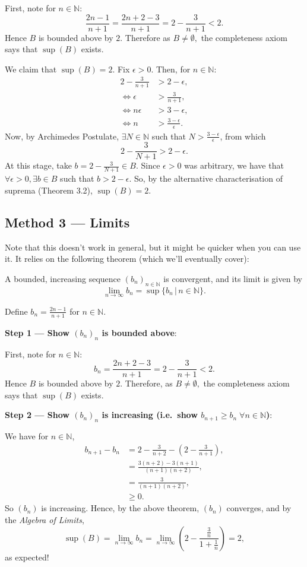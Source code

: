 \documentclass[
  10pt,
  a4paper]{article}
\theoremstyle{plain}
\theoremstyle{definition}
\theoremstyle{plain}
\theoremstyle{plain}
\theoremstyle{plain}
\theoremstyle{plain}
\theoremstyle{definition}
\theoremstyle{definition}
\newtheorem*{Order Axioms*}{Order Axioms}\newtheorem{Order Axioms}{Order Axioms}[section]
\theoremstyle{remark}
\theoremstyle{remark}
\let\BeginKnitrBlock\begin \let\EndKnitrBlock\end
\begin{document}
\BeginKnitrBlock{solution*}
First, note for \(n\in\mathbb{N}\): \[\frac{2n-1}{n+1} = \frac{2n+2-3}{n+1} = 2 - \frac{3}{n+1} < 2.\] Hence \(B\) is bounded above by \(2\). Therefore as \(B \neq \emptyset,\) the completeness axiom says that \(\sup(B)\) exists.

We claim that \(\sup(B) = 2.\) Fix \(\epsilon > 0.\) Then, for \(n \in \mathbb{N}:\)
\begin{align*}
2 - \frac{3}{n+1} &> 2-\epsilon,\\
\Leftrightarrow \epsilon &> \frac{3}{n+1},\\
\Leftrightarrow n\epsilon &> 3 - \epsilon,\\
\Leftrightarrow n &> \frac{3-\epsilon}{\epsilon}.
\end{align*}
Now, by Archimedes Postulate, \(\exists N \in \mathbb{N}\) such that \(N > \frac{3-\epsilon}{\epsilon}\), from which \[2 - \frac{3}{N+1} > 2- \epsilon.\] At this stage, take \(b = 2 - \frac{3}{N+1} \in B\). Since \(\epsilon > 0\) was arbitrary, we have that \(\forall \epsilon > 0, \exists b \in B\) such that \(b > 2-\epsilon.\) So, by the alternative characterisation of suprema (Theorem 3.2), \(\sup(B) = 2.\)
\EndKnitrBlock{solution*}

\hypertarget{method-3-limits}{%
\subsection*{Method 3 --- Limits}\label{method-3-limits}}

Note that this doesn't work in general, but it might be quicker when you can use it. It relies on the following theorem (which we'll eventually cover):
\BeginKnitrBlock{theorem}
{\label{thm:unnamed-chunk-5} }A bounded, increasing sequence \((b_n)_{n \in \mathbb{N}}\) is convergent, and its limit is given by \[\lim_{n \to \infty} b_n = \sup\lbrace b_n \,\lvert\, n \in \mathbb{N} \rbrace.\]
\EndKnitrBlock{theorem}

\BeginKnitrBlock{solution*}
Define \(b_n = \frac{2n - 1}{n+1}\) for \(n \in \mathbb{N}\).

\textbf{Step 1 --- Show \((b_n)_n\) is bounded above}:

First, note for \(n\in\mathbb{N}\): \[b_n = \frac{2n+2-3}{n+1} = 2 - \frac{3}{n+1} < 2.\] Hence \(B\) is bounded above by \(2\). Therefore, as \(B \neq \emptyset,\) the completeness axiom says that \(\sup(B)\) exists.

\textbf{Step 2 --- Show \((b_n)_n\) is increasing (i.e.~show \(b_{n+1} \geq b_n \; \forall n \in \mathbb{N}\))}:

We have for \(n \in \mathbb{N}\),
\begin{align*}
b_{n+1} - b_{n} &= 2 - \frac{3}{n+2} - \left(2 - \frac{3}{n+1}\right),\\
&= \frac{3(n+2)-3(n+1)}{(n+1)(n+2)},\\
&= \frac{3}{(n+1)(n+2)},\\
&\geq 0.
\end{align*}
So \((b_n)\) is increasing. Hence, by the above theorem, \((b_n)\) converges, and by the \emph{Algebra of Limits}, \[\sup(B) = \lim_{n \to \infty} b_n = \lim_{n \to \infty} \left(2 - \frac{\frac{3}{n}}{1 + \frac{1}{n}}\right) = 2,\]
as expected!
\EndKnitrBlock{solution*}
\end{document}
